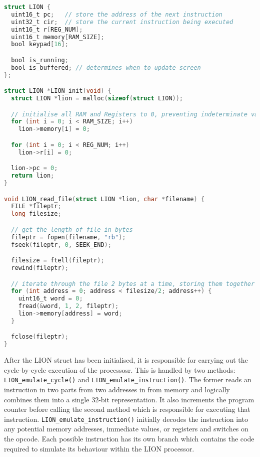 \label{LIONReadFile}
\begin{lstlisting}[language=C]
struct LION {
  uint16_t pc;   // store the address of the next instruction
  uint32_t cir;  // store the current instruction being executed
  uint16_t r[REG_NUM];
  uint16_t memory[RAM_SIZE];
  bool keypad[16];

  bool is_running;
  bool is_buffered; // determines when to update screen
};

struct LION *LION_init(void) {
  struct LION *lion = malloc(sizeof(struct LION));

  // initialise all RAM and Registers to 0, preventing indeterminate values
  for (int i = 0; i < RAM_SIZE; i++)
    lion->memory[i] = 0;

  for (int i = 0; i < REG_NUM; i++)
    lion->r[i] = 0;

  lion->pc = 0;
  return lion;
}

void LION_read_file(struct LION *lion, char *filename) {
  FILE *fileptr;
  long filesize;

  // get the length of file in bytes
  fileptr = fopen(filename, "rb");
  fseek(fileptr, 0, SEEK_END);

  filesize = ftell(fileptr);
  rewind(fileptr);

  // iterate through the file 2 bytes at a time, storing them together as a word in memory
  for (int address = 0; address < filesize/2; address++) {
    uint16_t word = 0;
    fread(&word, 1, 2, fileptr);
    lion->memory[address] = word;
  }

  fclose(fileptr);
}   
\end{lstlisting}

After the LION struct has been initialised, it is responsible for carrying out the cycle-by-cycle execution of the processosr. This is handled by two methods: \texttt{LION\_emulate\_cycle()} and \texttt{LION\_emulate\_instruction()}. The former reads an instruction in two parts from two addresses in from memory and logically combines them into a single 32-bit representation. It also increments the program counter before calling the second method which is responsible for executing that instruction. \texttt{LION\_emulate\_instruction()} initially decodes the instruction into any potential memory addresses, immediate values, or registers and switches on the opcode. Each possible instruction has its own branch which contains the code required to simulate its behaviour within the LION processor.


